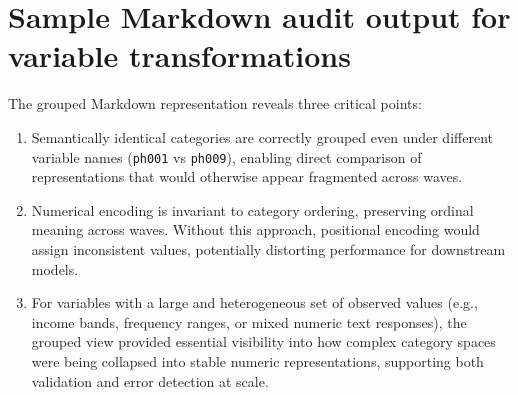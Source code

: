 \documentclass[twoside,12pt, openany]{Latex/Classes/PhDthesisPSnPDF}
\begin{document}

\chapter{Sample Markdown audit output for variable transformations}\label{app:md_audit}

    
    
    
The grouped Markdown representation reveals three critical points: 
\begin{enumerate}
    \item Semantically identical categories are correctly grouped even under different variable names (\texttt{ph001} vs \texttt{ph009}), enabling direct comparison of representations that would otherwise appear fragmented across waves. 
    \item Numerical encoding is invariant to category ordering, preserving ordinal meaning across waves. Without this approach, positional encoding would assign inconsistent values, potentially distorting performance for downstream models.
    \item For variables with a large and heterogeneous set of observed values (e.g., income bands, frequency ranges, or mixed numeric text responses), the grouped view provided essential visibility into how complex category spaces were being collapsed into stable numeric representations, supporting both validation and error detection at scale.
\end{enumerate}

\end{document}
